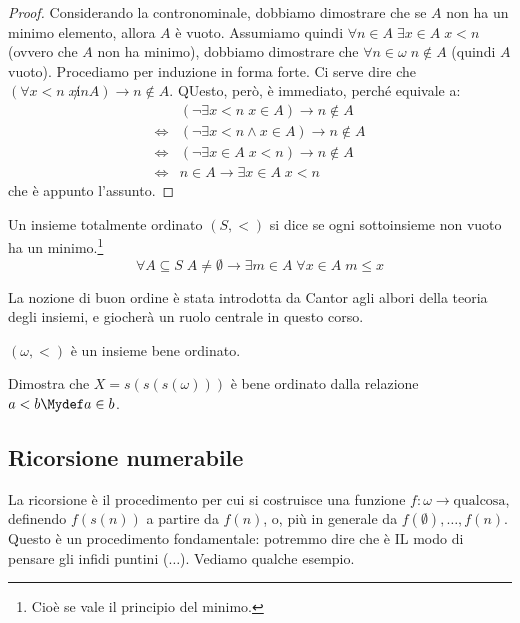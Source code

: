 \documentclass[11pt]{scrartcl}
\begin{document}
\begin{proof}
	Considerando la contronominale, dobbiamo dimostrare che se $A$ non ha un minimo elemento, allora $A$ è vuoto.
	Assumiamo quindi $\forall n \in A \; \exists x \in A \; x < n$ (ovvero che $A$ non ha minimo), dobbiamo dimostrare che $\forall n \in \omega \; n \not \in A$ (quindi $A$ vuoto). Procediamo per induzione in forma forte.
	Ci serve dire che $(\forall x < n \; x \not in A) \rightarrow n \not \in A$. QUesto, però, è immediato, perché equivale a:
	\[ \begin{split}
		& (\neg \exists x < n \; x \in A) \rightarrow n \not\in A\\
		\iff &(\neg \exists x < n \land x \in A) \rightarrow n \not\in A\\
		\iff &(\neg \exists x \in A \; x < n) \rightarrow n \not\in A\\
		\iff & n \in A \rightarrow \exists x \in A \; x < n
	\end{split}
		\]
	che è appunto l'assunto.
\end{proof}

\begin{definition}
	Un insieme totalmente ordinato $(S, <)$ si dice  se ogni sottoinsieme non vuoto ha un minimo.\footnote{Cioè se vale il principio del minimo.}
	\[ \forall A \subseteq S \; A \ne \emptyset \rightarrow \exists m \in A \; \forall x \in A \; m \leq x
		\]
\end{definition}

La nozione di buon ordine è stata introdotta da Cantor agli albori della teoria degli insiemi, e giocherà un ruolo centrale in questo corso.

\begin{example}
	$(\omega, <)$ è un insieme bene ordinato.
\end{example}

\begin{exercise}
	Dimostra che $X = s(s(s(\omega)))$ è bene ordinato dalla relazione $a < b \Mydef a \in b$.
\end{exercise}

\subsection{Ricorsione numerabile}
La ricorsione è il procedimento per cui si costruisce una funzione $f : \omega \longrightarrow \text{qualcosa}$, definendo $f(s(n))$ a partire da $f(n)$, o,
più in generale da $f(\emptyset),\ldots,f(n)$. Questo è un procedimento fondamentale: potremmo dire che è IL modo di pensare gli infidi puntini ($\ldots$). Vediamo qualche esempio.
\end{document}
